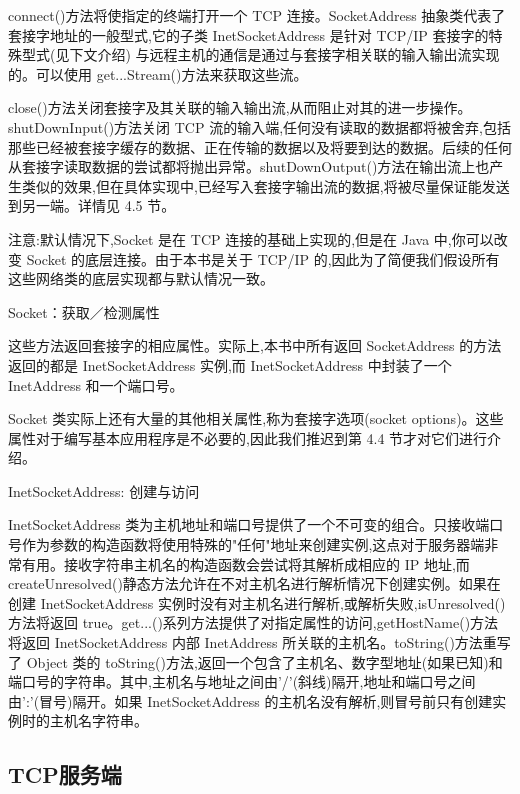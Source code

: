 		connect()方法将使指定的终端打开一个 TCP 连接。SocketAddress 抽象类代表了套接字地址的一般型式,它的子类 InetSocketAddress 是针对 TCP/IP 套接字的特殊型式(见下文介绍) 与远程主机的通信是通过与套接字相关联的输入输出流实现的。可以使用 get...Stream()方法来获取这些流。

		close()方法关闭套接字及其关联的输入输出流,从而阻止对其的进一步操作。shutDownInput()方法关闭 TCP 流的输入端,任何没有读取的数据都将被舍弃,包括那些已经被套接字缓存的数据、正在传输的数据以及将要到达的数据。后续的任何从套接字读取数据的尝试都将抛出异常。shutDownOutput()方法在输出流上也产生类似的效果,但在具体实现中,已经写入套接字输出流的数据,将被尽量保证能发送到另一端。详情见 4.5 节。

		注意:默认情况下,Socket 是在 TCP 连接的基础上实现的,但是在 Java 中,你可以改变 Socket 的底层连接。由于本书是关于 TCP/IP 的,因此为了简便我们假设所有这些网络类的底层实现都与默认情况一致。

		Socket：获取／检测属性

		

		这些方法返回套接字的相应属性。实际上,本书中所有返回 SocketAddress 的方法返回的都是 InetSocketAddress 实例,而 InetSocketAddress 中封装了一个 InetAddress 和一个端口号。

		Socket 类实际上还有大量的其他相关属性,称为套接字选项(socket options)。这些属性对于编写基本应用程序是不必要的,因此我们推迟到第 4.4 节才对它们进行介绍。

		InetSocketAddress: 创建与访问

		


		InetSocketAddress 类为主机地址和端口号提供了一个不可变的组合。只接收端口号作为参数的构造函数将使用特殊的"任何"地址来创建实例,这点对于服务器端非常有用。接收字符串主机名的构造函数会尝试将其解析成相应的 IP 地址,而 createUnresolved()静态方法允许在不对主机名进行解析情况下创建实例。如果在创建 InetSocketAddress 实例时没有对主机名进行解析,或解析失败,isUnresolved()方法将返回 true。get...()系列方法提供了对指定属性的访问,getHostName()方法将返回 InetSocketAddress 内部 InetAddress 所关联的主机名。toString()方法重写了 Object 类的 toString()方法,返回一个包含了主机名、数字型地址(如果已知)和端口号的字符串。其中,主机名与地址之间由'/'(斜线)隔开,地址和端口号之间由':'(冒号)隔开。如果 InetSocketAddress 的主机名没有解析,则冒号前只有创建实例时的主机名字符串。

	\subsection{TCP服务端}

